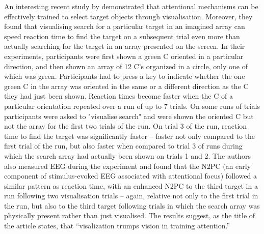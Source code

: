 \documentclass[smallextended]{svjour3}       %
\begin{document}
An interesting recent study by \cite{reinhart2015} demonstrated that attentional mechanisms can be effectively trained to select target objects through visualisation. Moreover, they found that visualising search for a particular target in an imagined array can speed reaction time to find the target on a subsequent trial even more than actually searching for the target in an array presented on the screen. In their experiments, participants were first shown a green C oriented in a particular direction, and then shown an array of 12 C's organized in a circle, only one of which was green. Participants had to press a key to indicate whether the one green C in the array was oriented in the same or a different direction as the C they had just been shown. Reaction times become faster when the C of a particular orientation repeated over a run of up to 7 trials. On some runs of trials participants were asked to "visualise search" and were shown the oriented C but not the array for the first two trials of the run. On trial 3 of the run, reaction time to find the target was significantly faster -- faster not only compared to the first trial of the run, but also faster when compared to trial 3 of runs during which the search array had actually been shown on trials 1 and 2. The authors also measured EEG during the experiment and found that the N2PC (an early component of stimulus-evoked EEG associated with attentional focus) followed a similar pattern as reaction time, with an enhanced N2PC to the third target in a run following two visualisation trials -- again, relative not only to the first trial in the run, but also to the third target following trials in which the search array was physically present rather than just visualised. The results suggest, as the title of the article states, that ``visalization trumps vision in training attention.'' 
\end{document}
